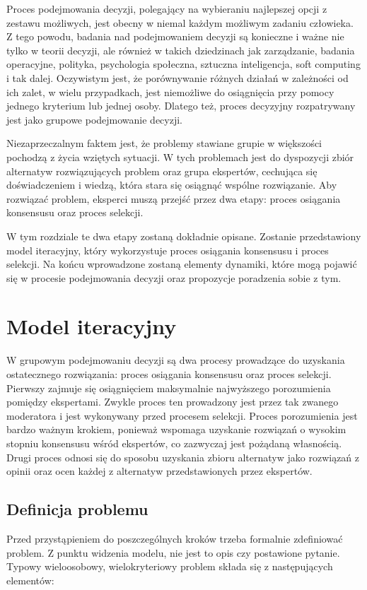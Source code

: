 Proces podejmowania decyzji, polegający na wybieraniu najlepszej opcji z 
zestawu możliwych, jest obecny w niemal każdym możliwym zadaniu człowieka. Z
tego powodu, badania nad podejmowaniem decyzji są konieczne i ważne nie tylko w 
teorii decyzji, ale również w takich dziedzinach jak zarządzanie, badania
operacyjne,  polityka, psychologia społeczna, sztuczna inteligencja, soft 
computing i tak dalej. Oczywistym jest, że porównywanie różnych działań w 
zależności od ich zalet, w wielu przypadkach, jest niemożliwe do osiągnięcia 
przy pomocy jednego kryterium lub jednej osoby. Dlatego też, proces decyzyjny 
rozpatrywany jest jako grupowe podejmowanie decyzji.

Niezaprzeczalnym faktem jest, że problemy stawiane grupie w większości pochodzą 
z życia wziętych sytuacji. W tych problemach jest do dyspozycji zbiór alternatyw
rozwiązujących problem oraz grupa ekspertów, cechująca się doświadczeniem i 
wiedzą, która stara się osiągnąć wspólne rozwiązanie. Aby rozwiązać problem, 
eksperci muszą przejść przez dwa etapy: proces osiągania konsensusu oraz proces 
selekcji.

W tym rozdziale te dwa etapy zostaną dokładnie opisane. Zostanie przedstawiony 
model iteracyjny, który wykorzystuje proces osiągania konsensusu i proces
selekcji.  Na końcu wprowadzone zostaną elementy dynamiki, które mogą pojawić 
się w procesie podejmowania decyzji oraz propozycje poradzenia sobie z tym.

\section{Model iteracyjny}
W grupowym podejmowaniu decyzji są dwa procesy prowadzące do uzyskania
ostatecznego rozwiązania: proces osiągania konsensusu oraz proces selekcji. 
Pierwszy zajmuje się osiągnięciem maksymalnie najwyższego porozumienia pomiędzy 
ekspertami. Zwykle proces ten prowadzony jest przez tak zwanego moderatora i
jest  wykonywany przed procesem selekcji. Proces porozumienia jest bardzo ważnym
krokiem, ponieważ wspomaga uzyskanie rozwiązań o wysokim stopniu konsensusu
wśród  ekspertów, co zazwyczaj jest pożądaną własnością. Drugi proces odnosi się
do sposobu uzyskania zbioru alternatyw jako rozwiązań z opinii oraz ocen każdej 
z alternatyw przedstawionych przez ekspertów.

\subsection{Definicja problemu}
Przed przystąpieniem do poszczególnych kroków trzeba formalnie zdefiniować 
problem. Z punktu widzenia modelu, nie jest to opis czy postawione pytanie. 
Typowy wieloosobowy, wielokryteriowy problem składa się z następujących 
elementów:


